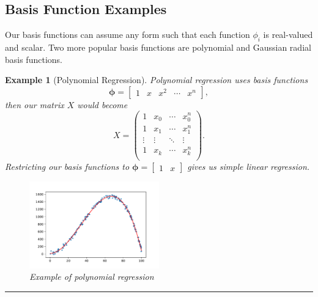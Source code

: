 \documentclass[10pt,a4paper, onecolumn, conference]{IEEEtran}
\theoremstyle{own}
\newtheorem{example}{Example}
\theoremstyle{definition}
\theoremstyle{plain}
\begin{document}
\subsection{Basis Function Examples}
Our basis functions can assume any form such that each function $\phi_i$ is real-valued and scalar. Two more popular basis functions are polynomial and Gaussian radial basis functions.
\begin{example}[Polynomial Regression]
Polynomial regression uses basis functions
\begin{equation}
\boldsymbol\phi = \left[ \begin{matrix} 1 & x & x^2 & \cdots & x^n  \end{matrix} \right],
\end{equation}
then our matrix $X$ would become
\begin{equation}
X = \left( \begin{matrix}
1 & x_0 & \cdots & x_0^n \\
1 & x_1 & \cdots & x_1^n \\
\vdots & \vdots & \ddots & \vdots \\
1 & x_k & \cdots & x_k^n \\
\end{matrix} \right).
\end{equation}
Restricting our basis functions to $\boldsymbol\phi = \left[ \begin{matrix} 1 & x \end{matrix} \right]$ gives us simple linear regression.
\begin{figure}[H]
\centering
\includegraphics[width = 0.5\textwidth]{polyBF_example}
\caption{Example of polynomial regression}
\label{fig2}
\end{figure}
\hrule
\vspace{2mm}
\end{example}
\end{document}
